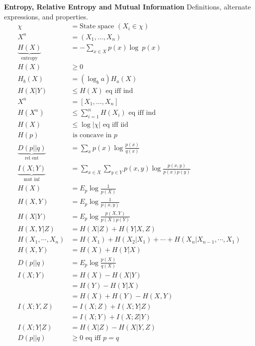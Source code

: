 \documentclass[10pt]{article}
\begin{document}
\begin{tiny}
\begin{multicols}{3}



\fontsize{5.99999pt}{5pt}

\textbf{\scriptsize Entropy, Relative Entropy and Mutual Information}
Definitions, alternate expressions, and properties.
\begin{align}
\chi &= \text{State space } (X_i \in \chi)\\
X^n &=(X_1,\ldots,X_n) \\
\underbrace{H(X)}_\text{entropy}&= -\sum_{x\in X} p(x) \log\ p(x) \label{eq:entropy}\\
H(X)& \geq 0\\
H_b(X)&= (\log_b a)H_a(X)\\
H(X|Y)& \leq  H(X)\text{ eq iff ind} \label{eq:conditioning}\\
X^n&=[X_1,\ldots,X_n]\\
H(X^n)& \leq \sum_{i=1}^n H(X_i)\text{ eq iff ind} \label{eq:jointsum}\\
H(X)&\leq  \log |\chi|  \text{ eq iff iid}\label{eq:alphabetentropy}\\
H(p)&\text{ is concave in $p$}\\
\underbrace{D(p||q)}_\text{rel ent} & = \sum_x p(x) \log \frac{p(x)}{q(x)}\\
\underbrace{I(X;Y)}_\text{mut inf} & = \sum_{x\in X} \sum_{y \in Y} p(x,y) \log \frac{p(x,y)}{p(x)p(y)}\\
H(X)&=E_p \log \frac{1}{p(X)}\\
H(X,Y)&=E_p\log \frac{1}{p(x,y)}\\
H(X|Y)&=E_p\log \frac{p(X,Y)}{p(X)p(Y)}\\
H(X,Y|Z)&= H(X|Z) + H(Y|X,Z) \\
H(X_1, \cdots, X_n) &= H(X_1) + H(X_2| X_1) + \cdots + H(X_n | X_{n-1}, \cdots, X_1) \\
H(X,Y)&=H(X) + H(Y|X) \\
D(p||q)&=E_p\log \frac{p(X)}{q(X)}\\
I(X;Y)&=H(X)-H(X|Y)\\
&=H(Y)-H(Y|X)\\
&=H(X)+H(Y)-H(X,Y)\\
I(X;Y,Z) &= I(X;Z) + I(X;Y|Z) \\
&= I(X;Y) + I(X;Z|Y)\\
I(X;Y|Z) &= H(X|Z) - H(X|Y,Z) \\
D(p||q)&\geq 0 \text{ eq iff $p=q$}\\

\end{align}
\end{multicols}
\end{tiny}
\end{document}
